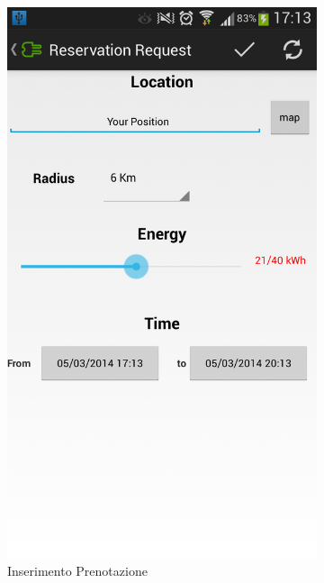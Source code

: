 \begin{figure}
	\centering
	\begin{subfigure}{0.45\textwidth}
		\includegraphics[width=\textwidth]{assets/mobile-app-charge-request.png}
		\caption{Inserimento Prenotazione}
		\label{fig:reservation}
	\end{subfigure}
	\begin{subfigure}{0.45\textwidth}

\end{subfigure}
\end{figure}
